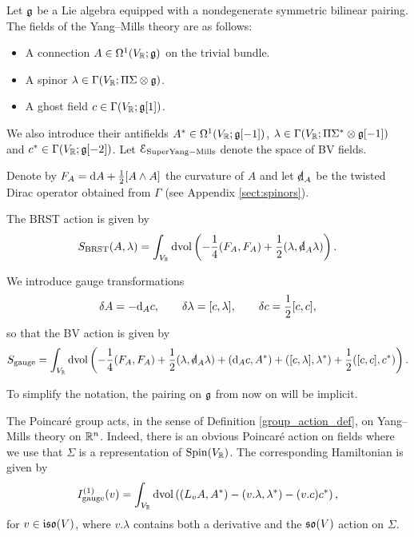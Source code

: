 \documentclass[10pt, oneside]{article}
\newcommand{\gauge}{\mathrm{gauge}}
\begin{document}
Let $\mathfrak g$ be a Lie algebra equipped with a nondegenerate symmetric bilinear pairing. The fields of the Yang--Mills theory are as follows:
\begin{itemize}
\item A connection $A \in \Omega^1(V_\mathbb R; \mathfrak g)$ on the trivial bundle.

\item A spinor $\lambda \in \Gamma(V_\mathbb R; \Pi \Sigma \otimes \mathfrak g)$.

\item A ghost field $c\in\Gamma(V_\mathbb R; \mathfrak g[1])$.
\end{itemize}
We also introduce their antifields $A^*\in\Omega^1(V_\mathbb R; \mathfrak g[-1])$, $\lambda\in\Gamma(V_\mathbb R; \Pi\Sigma^*\otimes \mathfrak g[-1])$ and $c^*\in\Gamma(V_\mathbb R; \mathfrak g[-2])$.
Let $\mathcal E_{\rm Super Yang-Mills}$ denote the space of BV fields. 

Denote by $F_A = {\rm d} A + \frac{1}{2}[A\wedge A]$ the curvature of $A$ and let $\sd\d_A$ be the twisted Dirac operator obtained from $\Gamma$ (see Appendix \ref{sect:spinors}).

The BRST action is given by
\[S_{\mr{BRST}}(A, \lambda) = \int_{V_\RR}\dvol \left( -\frac{1}{4} (F_A, F_A) + \frac{1}{2}(\lambda, \sd \d_A \lambda)\right).\]

We introduce gauge transformations
\[\delta A = -{\rm d}_A c,\qquad \delta \lambda = [c, \lambda],\qquad \delta c = \frac{1}{2}[c, c],\]
so that the BV action is given by
\begin{equation}
S_{\gauge} = \int_{V_\RR}\dvol \left( -\frac{1}{4} (F_A, F_A) + \frac{1}{2}(\lambda, \sd\d_A \lambda) + (\d_A c, A^*) + ([c, \lambda], \lambda^*) + \frac{1}{2}([c, c], c^*)\right).
\label{eq:YMBVaction}
\end{equation}

To simplify the notation, the pairing on $\mathfrak g$ from now on will be implicit.

The Poincar\'e group acts, in the sense of Definition \ref{group_action_def}, on Yang--Mills theory on $\mathbb R^n$. Indeed, there is an obvious Poincar\'e action on fields where we use that $\Sigma$ is a representation of $\mathrm{Spin}(V_\mathbb R)$. The corresponding Hamiltonian is given by
\begin{equation}
I_{\gauge}^{(1)}(v) = \int_{V_\RR}\dvol\left( (L_{v}A, A^*) - (v.\lambda, \lambda^*) - (v.c)c^*\right),
\label{eq:YMPoincareaction}
\end{equation}
for $v\in\mathfrak{iso}(V)$, where $v.\lambda$ contains both a derivative and the $\mathfrak{so}(V)$ action on $\Sigma$.
\end{document}
